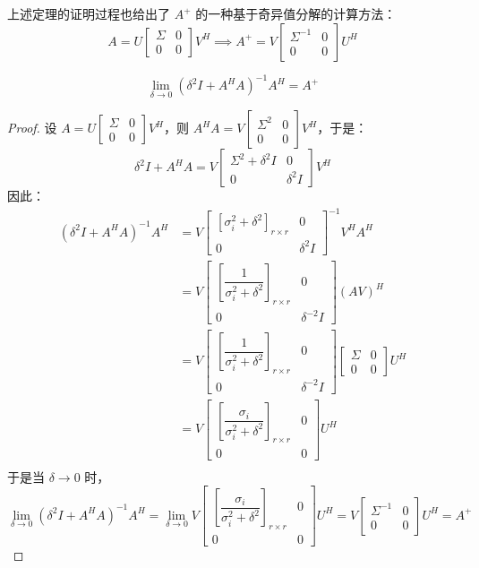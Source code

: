 \begin{remark}
上述定理的证明过程也给出了 $A^+$ 的一种基于奇异值分解的计算方法：
\[
    A=U\begin{bmatrix}\Sigma&0\\0&0\end{bmatrix}V^H\implies     A^+=V\begin{bmatrix}\Sigma^{-1}&0\\0&0\end{bmatrix}U^H
\]
\end{remark}

\begin{theorem}
\[
    \lim_{\delta\to0}(\delta^2I+A^HA)^{-1}A^H=A^+
\]
\end{theorem}
\begin{proof}
设 $A=U\begin{bmatrix}\Sigma&0\\0&0\end{bmatrix}V^H$，则 $A^HA=V\begin{bmatrix}\Sigma^2&0\\0&0\end{bmatrix}V^H$，于是：
\[\delta^2I+A^HA=V\begin{bmatrix}\Sigma^2+\delta^2I&0\\0&\delta^2I\end{bmatrix}V^H\]
因此：
\begin{align*}
    (\delta^2I+A^HA)^{-1}A^H&=V\begin{bmatrix}\left[\sigma_i^2+\delta^2\right]_{r\times r}&0\\0&\delta^2I\end{bmatrix}^{-1}V^HA^H\\
    &=V\begin{bmatrix}\left[\dfrac{1}{\sigma_i^2+\delta^2}\right]_{r\times r}&0\\0&\delta^{-2}I\end{bmatrix}(AV)^H\\
    &=V\begin{bmatrix}\left[\dfrac{1}{\sigma_i^2+\delta^2}\right]_{r\times r}&0\\0&\delta^{-2}I\end{bmatrix}\begin{bmatrix}\Sigma&0\\0&0\end{bmatrix}U^H\\
    &=V\begin{bmatrix}\left[\dfrac{\sigma_i}{\sigma_i^2+\delta^2}\right]_{r\times r}&0\\0&0\end{bmatrix}U^H\\
\end{align*}
于是当 $\delta\to0$ 时，
\[
\lim_{\delta\to0}(\delta^2I+A^HA)^{-1}A^H=\lim_{\delta\to0}V\begin{bmatrix}\left[\dfrac{\sigma_i}{\sigma_i^2+\delta^2}\right]_{r\times r}&0\\0&0\end{bmatrix}U^H=V\begin{bmatrix}\Sigma^{-1}&0\\0&0\end{bmatrix}U^H=A^+
\]
\end{proof}

